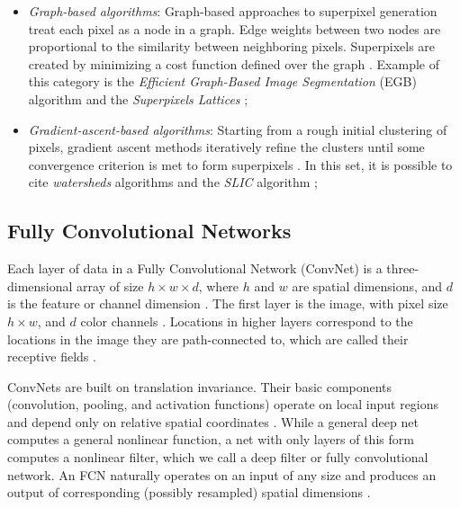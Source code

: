 \documentclass[10pt,twocolumn,letterpaper]{article}
\begin{document}
\begin{itemize}
 \item \textit{Graph-based algorithms}: Graph-based approaches to superpixel generation treat each pixel as a node in a graph. Edge weights between two nodes are proportional to the similarity between neighboring pixels. Superpixels are created by minimizing a cost function defined over the graph \cite{SLIC}. Example of this category is the \textit{Efficient Graph-Based Image Segmentation} (EGB) algorithm \cite{FELZENSZWALB} and the \textit{Superpixels Lattices} \cite{LATTICES};
 \item \textit{Gradient-ascent-based algorithms}: Starting from a rough initial clustering of pixels, gradient ascent methods iteratively refine the clusters until some convergence criterion is met to form superpixels \cite{SLIC}. In this set, it is possible to cite \textit{watersheds} algorithms \cite{WATERSHEDS} and the \textit{SLIC} algorithm \cite{SLIC};
\end{itemize}

\subsection{Fully Convolutional Networks} \label{ssec:fully_conv}

Each layer of data in a Fully Convolutional Network (ConvNet) is a three-dimensional array of size $h \times w \times d$, where $h$ and $w$ are spatial dimensions, and $d$ is the feature or channel dimension \cite{FULLY_CONVOLU}. The first layer is the image, with pixel size $h \times w$, and $d$ color channels \cite{FULLY_CONVOLU}. Locations in higher layers correspond to the locations in the image they are path-connected to, which are called their receptive fields \cite{FULLY_CONVOLU}.

ConvNets are built on translation invariance. Their basic components (convolution, pooling, and activation functions) operate on local input regions and depend only on relative spatial coordinates \cite{FULLY_CONVOLU}. While a general deep net computes a general nonlinear function, a net with only layers of this form computes a
nonlinear filter, which we call a deep filter or fully convolutional network. An FCN naturally operates on an input of any size and produces an output of corresponding (possibly resampled) spatial dimensions \cite{FULLY_CONVOLU}.

\end{document}
